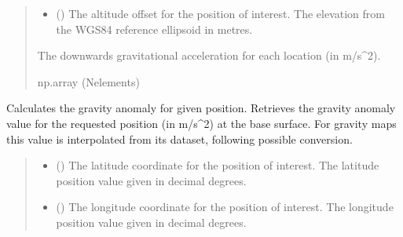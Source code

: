 \documentclass[letterpaper,10pt,english]{sphinxmanual}
\begin{document}
\begin{fulllineitems}
\begin{fulllineitems}
\begin{quote}
\begin{description}
\begin{itemize}
\item {} 
\sphinxAtStartPar
{} () \textendash{} The altitude offset for the position of interest.
The elevation from the WGS\sphinxhyphen{}84 reference ellipsoid in metres.

\end{itemize}

\sphinxAtStartPar
The downwards gravitational acceleration for each location
(in m/s\textasciicircum{}2).

\sphinxAtStartPar
np.array (N\sphinxhyphen{}elements)

\end{description}\end{quote}

\end{fulllineitems}


\begin{fulllineitems}
\label{\detokenize{modules/gravity/egm:qnav.gravity.egm.GeoidCorrection.get_anomaly}}
\pysigstartsignatures
{}
\pysigstopsignatures
\sphinxAtStartPar
Calculates the gravity anomaly for given position.
Retrieves the gravity anomaly value for the requested position
(in m/s\textasciicircum{}2) at the base surface. For gravity maps this value is
interpolated from its dataset, following possible conversion.
\begin{quote}\begin{description}
\begin{itemize}
\item {} 
\sphinxAtStartPar
{} () \textendash{} The latitude coordinate for the position of interest.
The latitude position value given in decimal degrees.

\item {} 
\sphinxAtStartPar
{} () \textendash{} The longitude coordinate for the position of interest.
The longitude position value given in decimal degrees.


\end{itemize}
\end{description}
\end{quote}
\end{fulllineitems}
\end{fulllineitems}
\end{document}
